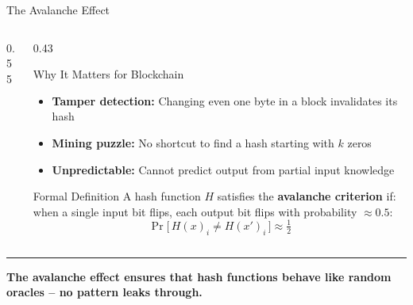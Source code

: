 \documentclass[8pt,aspectratio=169]{beamer}
\newcommand{\bottomnote}[1]{%
\vfill
\vspace{-2mm}
\textcolor{mllavender2}{\rule{\textwidth}{0.4pt}}
\vspace{1mm}
\footnotesize
\textbf{#1}
}
\begin{document}
\begin{frame}{The Avalanche Effect}
\begin{columns}[T]
\begin{column}{0.55\textwidth}
\begin{center}
\end{center}
\end{column}
\begin{column}{0.43\textwidth}
\begin{block}{\small Why It Matters for Blockchain}
\begin{itemize}\setlength\itemsep{3pt}
\item[\textcolor{mlgreen!80!black}{\textbullet}] \textbf{Tamper detection:} Changing even one byte in a block invalidates its hash
\item[\textcolor{mlblue}{\textbullet}] \textbf{Mining puzzle:} No shortcut to find a hash starting with $k$ zeros
\item[\textcolor{mlorange}{\textbullet}] \textbf{Unpredictable:} Cannot predict output from partial input knowledge
\end{itemize}
\end{block}

\vspace{2mm}
\begin{block}{\small Formal Definition}
A hash function $H$ satisfies the \textbf{avalanche criterion} if: when a single input bit flips, each output bit flips with probability $\approx 0.5$:
\[
\Pr\bigl[\,H(x)_i \neq H(x')_i\,\bigr] \approx \tfrac{1}{2}
\]
\end{block}
\end{column}
\end{columns}
\bottomnote{The avalanche effect ensures that hash functions behave like random oracles -- no pattern leaks through.}
\end{frame}
\end{document}
